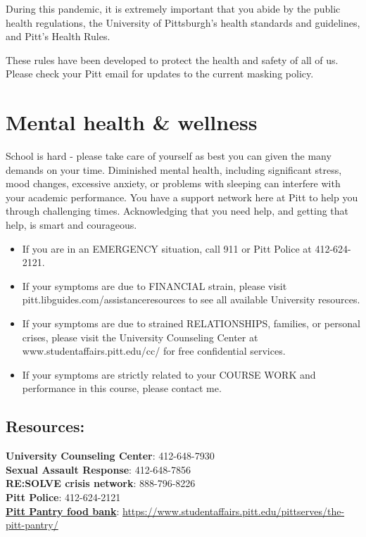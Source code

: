 \documentclass[
]{book}
\providecommand{\tightlist}{%
  \setlength{\itemsep}{0pt}\setlength{\parskip}{0pt}}
\begin{document}
During this pandemic, it is extremely important that you abide by the public health regulations, the University of Pittsburgh's health standards and guidelines, and Pitt's Health Rules.

These rules have been developed to protect the health and safety of all of us. Please check your Pitt email for updates to the current masking policy.

\hypertarget{mental-health-wellness}{%
\chapter{Mental health \& wellness}\label{mental-health-wellness}}

School is hard - please take care of yourself as best you can given the many demands on your time. Diminished mental health, including significant stress, mood changes, excessive anxiety, or problems with sleeping can interfere with your academic performance. You have a support network here at Pitt to help you through challenging times. Acknowledging that you need help, and getting that help, is smart and courageous.

\begin{itemize}
\tightlist
\item
  If you are in an EMERGENCY situation, call 911 or Pitt Police at 412-624-2121.
\item
  If your symptoms are due to FINANCIAL strain, please visit pitt.libguides.com/assistanceresources to see all available University resources.
\item
  If your symptoms are due to strained RELATIONSHIPS, families, or personal crises, please visit the University Counseling Center at www.studentaffairs.pitt.edu/cc/ for free confidential services.
\item
  If your symptoms are strictly related to your COURSE WORK and performance in this course, please contact me.
\end{itemize}

\hypertarget{resources}{%
\section{Resources:}\label{resources}}

\textbf{University Counseling Center}: 412-648-7930\\
\textbf{Sexual Assault Response}: 412-648-7856\\
\textbf{RE:SOLVE crisis network}: 888-796-8226\\
\textbf{Pitt Police}: 412-624-2121\\
\href{https://www.studentaffairs.pitt.edu/pittserves/the-pitt-pantry/}{\textbf{Pitt Pantry food bank}}: \url{https://www.studentaffairs.pitt.edu/pittserves/the-pitt-pantry/}
\end{document}
